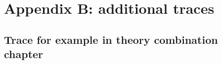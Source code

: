 \chapter*{Appendix B: additional traces }


\section{Trace for example in theory combination chapter}




